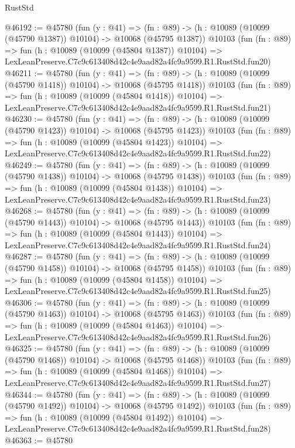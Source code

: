 \begin{lexlean}{RustStd}
\begin{coremodule}
@46192 := @45780
    (fun (y : @41) =>
    (fn : @89) -> (h : @10089 (@10099 (@45790 @1387)) @10104) -> @10068 (@45795 @1387))
    @10103
    (fun (fn : @89) =>
    fun (h : @10089 (@10099 (@45804 @1387)) @10104) =>
    LexLeanPreserve.C7c9c613408d42c4e9aad82a4fc9a9599.R1.RustStd.fun20)
@46211 := @45780
    (fun (y : @41) =>
    (fn : @89) -> (h : @10089 (@10099 (@45790 @1418)) @10104) -> @10068 (@45795 @1418))
    @10103
    (fun (fn : @89) =>
    fun (h : @10089 (@10099 (@45804 @1418)) @10104) =>
    LexLeanPreserve.C7c9c613408d42c4e9aad82a4fc9a9599.R1.RustStd.fun21)
@46230 := @45780
    (fun (y : @41) =>
    (fn : @89) -> (h : @10089 (@10099 (@45790 @1423)) @10104) -> @10068 (@45795 @1423))
    @10103
    (fun (fn : @89) =>
    fun (h : @10089 (@10099 (@45804 @1423)) @10104) =>
    LexLeanPreserve.C7c9c613408d42c4e9aad82a4fc9a9599.R1.RustStd.fun22)
@46249 := @45780
    (fun (y : @41) =>
    (fn : @89) -> (h : @10089 (@10099 (@45790 @1438)) @10104) -> @10068 (@45795 @1438))
    @10103
    (fun (fn : @89) =>
    fun (h : @10089 (@10099 (@45804 @1438)) @10104) =>
    LexLeanPreserve.C7c9c613408d42c4e9aad82a4fc9a9599.R1.RustStd.fun23)
@46268 := @45780
    (fun (y : @41) =>
    (fn : @89) -> (h : @10089 (@10099 (@45790 @1443)) @10104) -> @10068 (@45795 @1443))
    @10103
    (fun (fn : @89) =>
    fun (h : @10089 (@10099 (@45804 @1443)) @10104) =>
    LexLeanPreserve.C7c9c613408d42c4e9aad82a4fc9a9599.R1.RustStd.fun24)
@46287 := @45780
    (fun (y : @41) =>
    (fn : @89) -> (h : @10089 (@10099 (@45790 @1458)) @10104) -> @10068 (@45795 @1458))
    @10103
    (fun (fn : @89) =>
    fun (h : @10089 (@10099 (@45804 @1458)) @10104) =>
    LexLeanPreserve.C7c9c613408d42c4e9aad82a4fc9a9599.R1.RustStd.fun25)
@46306 := @45780
    (fun (y : @41) =>
    (fn : @89) -> (h : @10089 (@10099 (@45790 @1463)) @10104) -> @10068 (@45795 @1463))
    @10103
    (fun (fn : @89) =>
    fun (h : @10089 (@10099 (@45804 @1463)) @10104) =>
    LexLeanPreserve.C7c9c613408d42c4e9aad82a4fc9a9599.R1.RustStd.fun26)
@46325 := @45780
    (fun (y : @41) =>
    (fn : @89) -> (h : @10089 (@10099 (@45790 @1468)) @10104) -> @10068 (@45795 @1468))
    @10103
    (fun (fn : @89) =>
    fun (h : @10089 (@10099 (@45804 @1468)) @10104) =>
    LexLeanPreserve.C7c9c613408d42c4e9aad82a4fc9a9599.R1.RustStd.fun27)
@46344 := @45780
    (fun (y : @41) =>
    (fn : @89) -> (h : @10089 (@10099 (@45790 @1492)) @10104) -> @10068 (@45795 @1492))
    @10103
    (fun (fn : @89) =>
    fun (h : @10089 (@10099 (@45804 @1492)) @10104) =>
    LexLeanPreserve.C7c9c613408d42c4e9aad82a4fc9a9599.R1.RustStd.fun28)
@46363 := @45780

\end{coremodule}
\end{lexlean}
